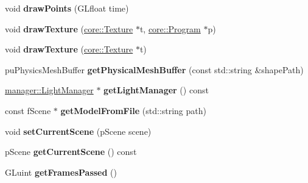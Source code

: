 \begin{DoxyCompactItemize}
\item 
\hypertarget{classfillwave_1_1Engine_a29d9953bd25b6cd33b9bf1f0ea5df431}{}void {\bfseries draw\+Points} (G\+Lfloat time)\label{classfillwave_1_1Engine_a29d9953bd25b6cd33b9bf1f0ea5df431}

\item 
\hypertarget{classfillwave_1_1Engine_a459fceda9f89ab99df831fb3dcef6f55}{}void {\bfseries draw\+Texture} (\hyperlink{classfillwave_1_1core_1_1Texture}{core\+::\+Texture} $\ast$t, \hyperlink{classfillwave_1_1core_1_1Program}{core\+::\+Program} $\ast$p)\label{classfillwave_1_1Engine_a459fceda9f89ab99df831fb3dcef6f55}

\item 
\hypertarget{classfillwave_1_1Engine_a5755d2d20fd2a24c95282adc6263cbbe}{}void {\bfseries draw\+Texture} (\hyperlink{classfillwave_1_1core_1_1Texture}{core\+::\+Texture} $\ast$t)\label{classfillwave_1_1Engine_a5755d2d20fd2a24c95282adc6263cbbe}

\item 
\hypertarget{classfillwave_1_1Engine_a16884ac1bd9a55ee11cb915bc7ac1bad}{}pu\+Physics\+Mesh\+Buffer {\bfseries get\+Physical\+Mesh\+Buffer} (const std\+::string \&shape\+Path)\label{classfillwave_1_1Engine_a16884ac1bd9a55ee11cb915bc7ac1bad}

\item 
\hypertarget{classfillwave_1_1Engine_aee372063724f3029b0f41ec4b826106e}{}\hyperlink{classfillwave_1_1manager_1_1LightManager}{manager\+::\+Light\+Manager} $\ast$ {\bfseries get\+Light\+Manager} () const \label{classfillwave_1_1Engine_aee372063724f3029b0f41ec4b826106e}

\item 
\hypertarget{classfillwave_1_1Engine_a29a0fe99323dc6150ad3cddfb49e752f}{}const f\+Scene $\ast$ {\bfseries get\+Model\+From\+File} (std\+::string path)\label{classfillwave_1_1Engine_a29a0fe99323dc6150ad3cddfb49e752f}

\item 
\hypertarget{classfillwave_1_1Engine_aa7001ee49ec51a6a47fdd3b9fa0619df}{}void {\bfseries set\+Current\+Scene} (p\+Scene scene)\label{classfillwave_1_1Engine_aa7001ee49ec51a6a47fdd3b9fa0619df}

\item 
\hypertarget{classfillwave_1_1Engine_aa8f9cf557a945bec3447af175888b256}{}p\+Scene {\bfseries get\+Current\+Scene} () const \label{classfillwave_1_1Engine_aa8f9cf557a945bec3447af175888b256}

\item 
\hypertarget{classfillwave_1_1Engine_a019edbfa9aa9dcae5775e909df489248}{}G\+Luint {\bfseries get\+Frames\+Passed} ()\label{classfillwave_1_1Engine_a019edbfa9aa9dcae5775e909df489248}


\end{DoxyCompactItemize}
